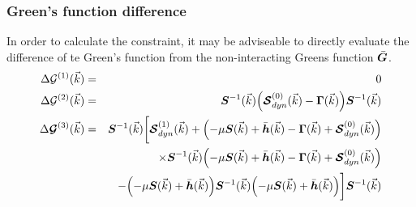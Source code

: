 \documentclass[11pt,a4paper]{report}
\begin{document}
\subsubsection{Green's function difference}
In order to calculate the constraint, it may be adviseable to directly
evaluate the difference of te Green's function from the
non-interacting Greens function $\bar{\bm{G}}$.
\begin{eqnarray}
\Delta\mathcal{G}^{(1)}(\vec{k})&=&0
\nonumber\\
\Delta\mathcal{G}^{(2)}(\vec{k})&=&\mat{S}^{-1}(\vec{k})
\Bigl(
\mat{\mathcal{S}}^{(0)}_{dyn}(\vec{k})-\mat{\Gamma}(\vec{k})
\Bigr)
\mat{S}^{-1}(\vec{k})
%
\nonumber\\
\Delta\mat{\mathcal{G}}^{(3)}(\vec{k})
&=&
\mat{S}^{-1}(\vec{k})
\biggl[
\mat{\mathcal{S}}^{(1)}_{dyn}(\vec{k})+
\Bigl(-\mu\mat{S}(\vec{k})+\bar{\mat{h}}(\vec{k})-\mat{\Gamma}(\vec{k})
+\mat{\mathcal{S}}^{(0)}_{dyn}(\vec{k})\Bigr)
\nonumber\\
&&\times\mat{S}^{-1}(\vec{k})
\Bigl(-\mu\mat{S}(\vec{k})+\bar{\mat{h}}(\vec{k})-\mat{\Gamma}(\vec{k})
+\mat{\mathcal{S}}^{(0)}_{dyn}(\vec{k})\Bigr)
\nonumber\\
&&-
\Bigl(-\mu\mat{S}(\vec{k})+\bar{\mat{h}}(\vec{k})\Bigr)
\mat{S}^{-1}(\vec{k})
\Bigl(-\mu\mat{S}(\vec{k})+\bar{\mat{h}}(\vec{k})\Bigr)
\biggr]
\mat{S}^{-1}(\vec{k})
\end{eqnarray}

\end{document}
